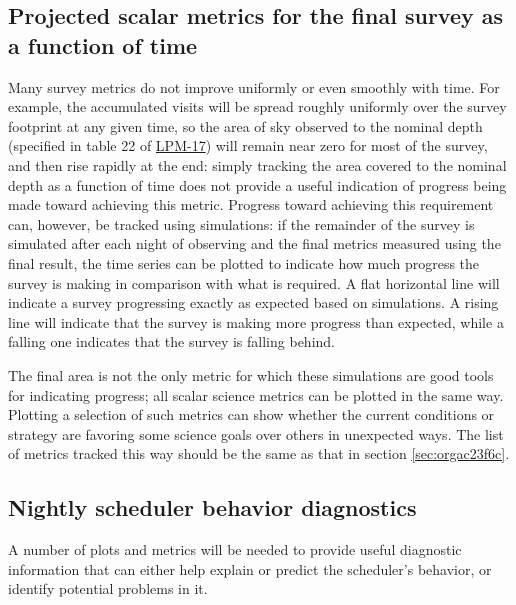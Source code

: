\subsection{Projected scalar metrics for the final survey as a function of time}
\label{sec:org260c640}
Many survey metrics do not improve uniformly or even smoothly with time.
For example, the accumulated visits will be spread roughly uniformly over the survey footprint at any given time, so the area of sky observed to the nominal depth (specified in table 22 of \href{http://ls.st/lpm-17}{LPM-17}) will remain near zero for most of the survey, and then rise rapidly at the end: simply tracking the area covered to the nominal depth as a function of time does not provide a useful indication of progress being made toward achieving this metric.
Progress toward achieving this requirement can, however, be tracked using simulations: if the remainder of the survey is simulated after each night of observing and the final metrics measured using the final result, the time series can be plotted to indicate how much progress the survey is making in comparison with what is required.
A flat horizontal line will indicate a survey progressing exactly as expected based on simulations.
A rising line will indicate that the survey is making more progress than expected, while a falling one indicates that the survey is falling behind.

The final area is not the only metric for which these simulations are good tools for indicating progress; all scalar science metrics can be plotted in the same way. Plotting a selection of such metrics can show whether the current conditions or strategy are favoring some science goals over others in unexpected ways.
The list of metrics tracked this way should be the same as that in section \ref{sec:orgac23f6c}.

\subsection{Nightly scheduler behavior diagnostics}
\label{sec:orgc0a3331}
A number of plots and metrics will be needed to provide useful diagnostic information that can either help explain or predict the scheduler's behavior, or identify potential problems in it.

